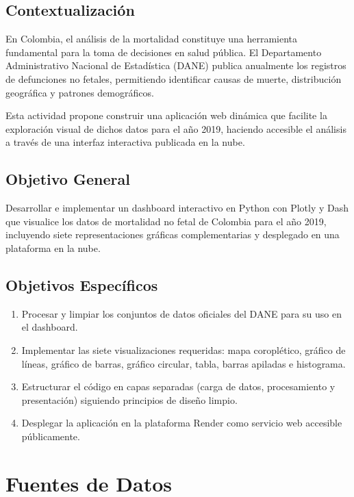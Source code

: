 \documentclass[a4paper,12pt]{report}
\numberwithin{equation}{chapter}
\numberwithin{figure}{chapter}
\numberwithin{table}{chapter}
\begin{document}
\section{Contextualización}

En Colombia, el análisis de la mortalidad constituye una herramienta fundamental para la toma de decisiones en salud pública. El Departamento Administrativo Nacional de Estadística (DANE) publica anualmente los registros de defunciones no fetales, permitiendo identificar causas de muerte, distribución geográfica y patrones demográficos.

Esta actividad propone construir una aplicación web dinámica que facilite la exploración visual de dichos datos para el año 2019, haciendo accesible el análisis a través de una interfaz interactiva publicada en la nube.

\section{Objetivo General}

Desarrollar e implementar un dashboard interactivo en Python con Plotly y Dash que visualice los datos de mortalidad no fetal de Colombia para el año 2019, incluyendo siete representaciones gráficas complementarias y desplegado en una plataforma en la nube.

\section{Objetivos Específicos}

\begin{enumerate}
    \item Procesar y limpiar los conjuntos de datos oficiales del DANE para su uso en el dashboard.
    \item Implementar las siete visualizaciones requeridas: mapa coroplético, gráfico de líneas, gráfico de barras, gráfico circular, tabla, barras apiladas e histograma.
    \item Estructurar el código en capas separadas (carga de datos, procesamiento y presentación) siguiendo principios de diseño limpio.
    \item Desplegar la aplicación en la plataforma Render como servicio web accesible públicamente.
\end{enumerate}

\chapter{Fuentes de Datos}\label{chap:datos}
\end{document}
